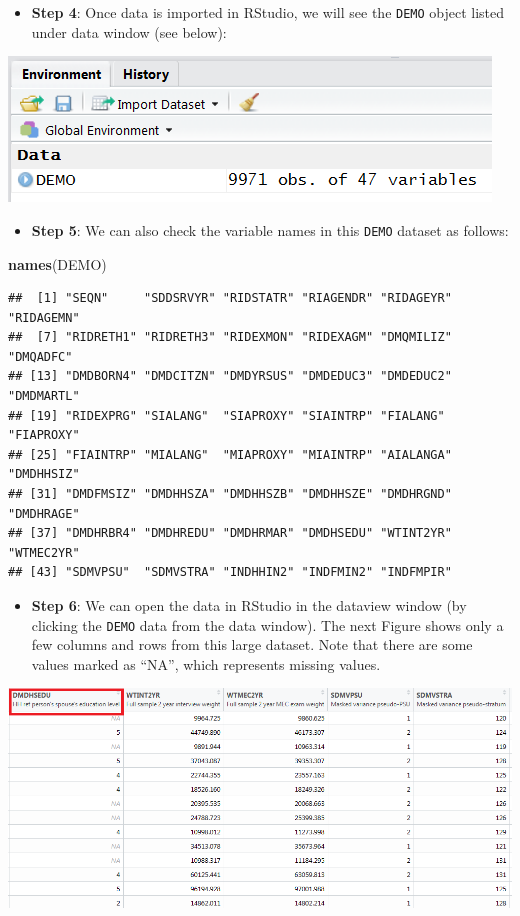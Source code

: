 \documentclass[
]{book}
\newenvironment{Shaded}{\begin{snugshade}}{\end{snugshade}}
\newcommand{\KeywordTok}[1]{\textcolor[rgb]{0.13,0.29,0.53}{\textbf{#1}}}
\newcommand{\NormalTok}[1]{#1}
\providecommand{\tightlist}{%
  \setlength{\itemsep}{0pt}\setlength{\parskip}{0pt}}
\begin{document}
\begin{itemize}
\tightlist
\item
  \textbf{Step 4}: Once data is imported in RStudio, we will see the \texttt{DEMO} object listed under data window (see below):
\end{itemize}

\includegraphics[width=0.65\linewidth]{images/rdata}

\begin{itemize}
\tightlist
\item
  \textbf{Step 5}: We can also check the variable names in this \texttt{DEMO} dataset as follows:
\end{itemize}

\begin{Shaded}
\begin{Highlighting}[]
\KeywordTok{names}\NormalTok{(DEMO)}
\end{Highlighting}
\end{Shaded}

\begin{verbatim}
##  [1] "SEQN"     "SDDSRVYR" "RIDSTATR" "RIAGENDR" "RIDAGEYR" "RIDAGEMN"
##  [7] "RIDRETH1" "RIDRETH3" "RIDEXMON" "RIDEXAGM" "DMQMILIZ" "DMQADFC" 
## [13] "DMDBORN4" "DMDCITZN" "DMDYRSUS" "DMDEDUC3" "DMDEDUC2" "DMDMARTL"
## [19] "RIDEXPRG" "SIALANG"  "SIAPROXY" "SIAINTRP" "FIALANG"  "FIAPROXY"
## [25] "FIAINTRP" "MIALANG"  "MIAPROXY" "MIAINTRP" "AIALANGA" "DMDHHSIZ"
## [31] "DMDFMSIZ" "DMDHHSZA" "DMDHHSZB" "DMDHHSZE" "DMDHRGND" "DMDHRAGE"
## [37] "DMDHRBR4" "DMDHREDU" "DMDHRMAR" "DMDHSEDU" "WTINT2YR" "WTMEC2YR"
## [43] "SDMVPSU"  "SDMVSTRA" "INDHHIN2" "INDFMIN2" "INDFMPIR"
\end{verbatim}

\begin{itemize}
\tightlist
\item
  \textbf{Step 6}: We can open the data in RStudio in the dataview window (by clicking the \texttt{DEMO} data from the data window). The next Figure shows only a few columns and rows from this large dataset. Note that there are some values marked as ``NA'', which represents missing values.
\end{itemize}

\includegraphics[width=0.65\linewidth]{images/dataview}
\end{document}
